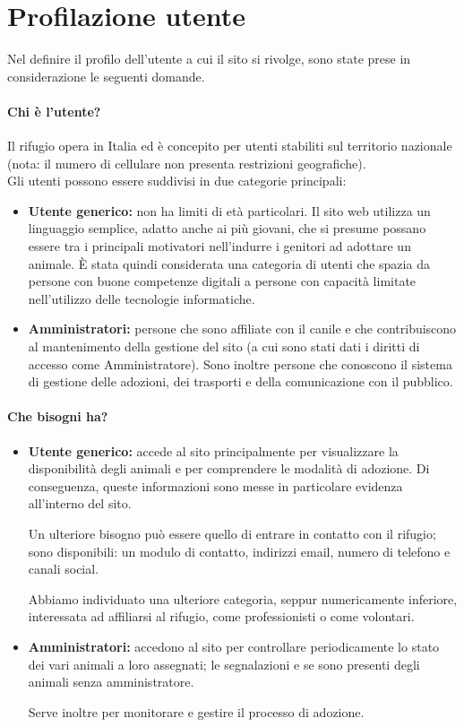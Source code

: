 \section{Profilazione utente}
Nel definire il profilo dell’utente a cui il sito si rivolge, sono state prese in considerazione le seguenti domande.

\paragraph{Chi è l’utente?}
Il rifugio opera in Italia ed è concepito per utenti stabiliti sul territorio nazionale (nota: il numero di cellulare non presenta restrizioni geografiche).  \\
Gli utenti possono essere suddivisi in due categorie principali:
\begin{itemize}
    \item \textbf{Utente generico:} non ha limiti di età particolari. Il sito web utilizza un linguaggio semplice, adatto anche ai più giovani, che si presume possano essere tra i principali motivatori nell’indurre i genitori ad adottare un animale. È stata quindi considerata una categoria di utenti che spazia da persone con buone competenze digitali a persone con capacità limitate nell’utilizzo delle tecnologie informatiche.
    \item \textbf{Amministratori:} persone che sono affiliate con il canile e che contribuiscono al mantenimento della gestione del sito (a cui sono stati dati i diritti di accesso come Amministratore).  Sono inoltre persone che conoscono il sistema di gestione delle adozioni, dei trasporti e della comunicazione con il pubblico. 
\end{itemize}

\paragraph{Che bisogni ha?}
\begin{itemize}
    \item \textbf{Utente generico:} accede al sito principalmente per visualizzare la disponibilità degli animali e per comprendere le modalità di adozione. Di conseguenza, queste informazioni sono messe in particolare evidenza all’interno del sito.

    Un ulteriore bisogno può essere quello di entrare in contatto con il rifugio; sono disponibili: un modulo di contatto, indirizzi email, numero di telefono e canali social.  

    Abbiamo individuato una ulteriore categoria, seppur numericamente inferiore, interessata ad affiliarsi al rifugio, come professionisti o come volontari.
    \item \textbf{Amministratori:} accedono al sito per controllare periodicamente lo stato dei vari animali a loro assegnati; le segnalazioni e se sono presenti degli animali senza amministratore.
    
    Serve inoltre per monitorare e gestire il processo di adozione.
\end{itemize}

